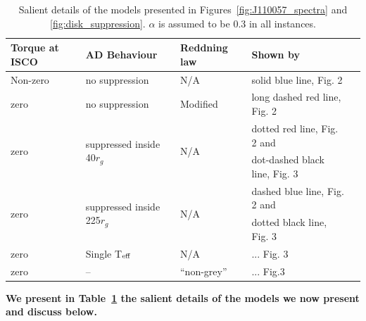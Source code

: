 \documentclass[a4paper,fleqn,usenatbib]{mnras}
\begin{document}
\begin{table}
  \centering
  \begin{tabular}{l l l l l }
    \hline \hline 
    Torque at ISCO & AD Behaviour & Reddning law  & Shown by \\
    \hline
    Non-zero & no suppression                       & N/A                                           & solid blue line, Fig. 2\\
    zero &   no suppression                             & Modified \citet{Guo2016}      & long dashed red line, Fig. 2\\
\multirow{ 2}{*}{zero} & \multirow{ 2}{*}{suppressed inside 40$r_g$}      & \multirow{ 2}{*}{N/A}       & dotted red line, Fig. 2 and \\
            &                                                &                                         &  dot-dashed black line, Fig. 3\\
\multirow{ 2}{*}{zero} & \multirow{ 2}{*}{suppressed inside 225$r_g$}   &\multirow{ 2}{*}{N/A }         &  dashed blue line, Fig. 2 and \\
            &                                                &                                         &  dotted black line, Fig. 3\\
          zero         &  Single T$_{\rm eff}$                   &  N/A                                          &  ... Fig. 3\\
          zero        & --                                                 & ``non-grey''                            &  ... Fig.3 \\
    \hline 
    \hline 
  \end{tabular}
  \caption{Salient details of the models presented in Figures~\ref{fig:J110057_spectra} and 
  \ref{fig:disk_suppression}. $\alpha$ is assumed to be 0.3 in all instances. 
} 
 \label{tab:models}
\end{table}

{\bf We present in Table~\ref{tab:models} the salient details of the models 
we now present and discuss below. 
}
\end{document}
